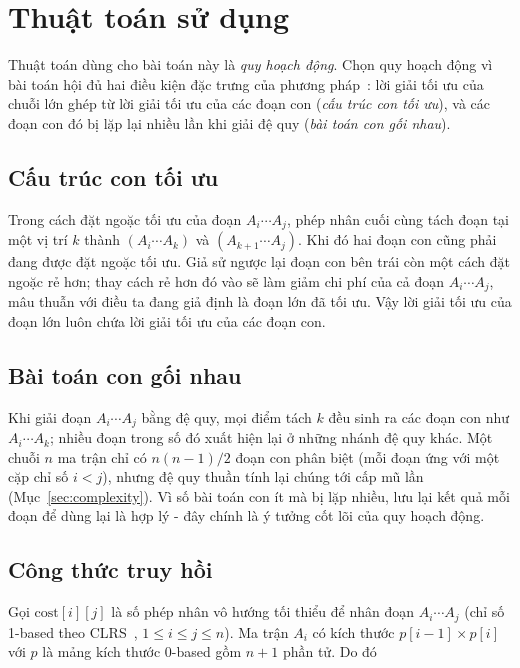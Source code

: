 \documentclass[12pt,a4paper]{article}
\begin{document}
\section{Thuật toán sử dụng}

Thuật toán dùng cho bài toán này là \emph{quy hoạch động}. Chọn quy hoạch động vì bài toán hội đủ hai điều kiện đặc trưng của phương pháp~\cite{clrs,dpv}: lời giải tối ưu của chuỗi lớn ghép từ lời giải tối ưu của các đoạn con (\emph{cấu trúc con tối ưu}), và các đoạn con đó bị lặp lại nhiều lần khi giải đệ quy (\emph{bài toán con gối nhau}). 

\subsection{Cấu trúc con tối ưu}
Trong cách đặt ngoặc tối ưu của đoạn $A_i \cdots A_j$, phép nhân cuối cùng tách đoạn tại một vị trí $k$ thành $(A_i \cdots A_k)$ và $(A_{k+1} \cdots A_j)$. Khi đó hai đoạn con cũng phải đang được đặt ngoặc tối ưu. 
\newline Giả sử ngược lại đoạn con bên trái còn một cách đặt ngoặc rẻ hơn; thay cách rẻ hơn đó vào sẽ làm giảm chi phí của cả đoạn $A_i \cdots A_j$, mâu thuẫn với điều ta đang giả định là đoạn lớn đã tối ưu. Vậy lời giải tối ưu của đoạn lớn luôn chứa lời giải tối ưu của các đoạn con.

\subsection{Bài toán con gối nhau}
Khi giải đoạn $A_i \cdots A_j$ bằng đệ quy, mọi điểm tách $k$ đều sinh ra các đoạn con như $A_i \cdots A_k$; nhiều đoạn trong số đó xuất hiện lại ở những nhánh đệ quy khác. Một chuỗi $n$ ma trận chỉ có $n(n-1)/2$ đoạn con phân biệt (mỗi đoạn ứng với một cặp chỉ số $i < j$), nhưng đệ quy thuần tính lại chúng tới cấp mũ lần (Mục~\ref{sec:complexity}). Vì số bài toán con ít mà bị lặp nhiều, lưu lại kết quả mỗi đoạn để dùng lại là hợp lý - đây chính là ý tưởng cốt lõi của quy hoạch động.

\subsection{Công thức truy hồi}
Gọi $\mathrm{cost}[i][j]$ là số phép nhân vô hướng tối thiểu để nhân đoạn $A_i \cdots A_j$ (chỉ số 1-based theo CLRS~\cite{clrs}, $1 \le i \le j \le n$). Ma trận $A_i$ có kích thước $p[i-1] \times p[i]$ với $p$ là mảng kích thước 0-based gồm $n+1$ phần tử. Do đó
\end{document}
